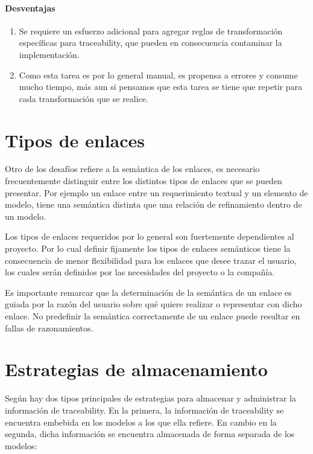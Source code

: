\documentclass[a4paper,12pt,oneside,spanish]{book}
\begin{document}
\paragraph{Desventajas}

\begin{enumerate}

\item Se requiere un esfuerzo adicional para agregar reglas de transformación específicas para traceability, que pueden en consecuencia contaminar la implementación.

\item Como esta tarea es por lo general manual, es propensa a errores y consume mucho tiempo, más aun si pensamos que esta tarea se tiene que repetir para cada transformación que se realice.

\end{enumerate}

\section{Tipos de enlaces}

Otro de los desafíos refiere a la semántica de los enlaces, es necesario frecuentemente distinguir entre los distintos tipos de enlaces que se pueden presentar. Por ejemplo un enlace entre un requerimiento textual y un elemento de modelo, tiene una semántica distinta que una relación de refinamiento dentro de un modelo.

Los tipos de enlaces requeridos por lo general son fuertemente dependientes al proyecto. Por lo cual definir fijamente los tipos de enlaces semánticos tiene la consecuencia de menor flexibilidad para los enlaces que desee trazar el usuario, los cuales serán definidos por las necesidades del proyecto o la compañía.

Es importante remarcar que la determinación de la semántica de un enlace es guiada por la razón del usuario sobre qué quiere realizar o representar con dicho enlace. No predefinir la semántica correctamente de un enlace puede resultar en fallas de razonamientos.

\section{Estrategias de almacenamiento}

Según \cite{DrivalosPaigeFernandesKolovos} hay dos tipos principales de estrategias para almacenar y administrar la información de traceability. En la primera, la información de traceability se encuentra embebida en los modelos a los que ella refiere. En cambio en la segunda, dicha información se encuentra almacenada de forma separada de los modelos:
\end{document}
